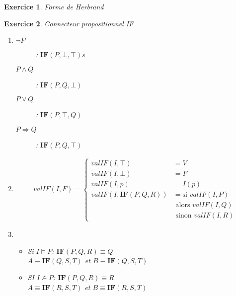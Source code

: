 \documentclass{article}
\theoremstyle{plain}
\newtheorem{exo}{Exercice}%
\begin{document}
\begin{exo} Forme de Herbrand
    
\end{exo}

\begin{exo} Connecteur propositionnel IF
\begin{enumerate}
    \item \begin{description}
        \item[$\neg P$]: $\textbf{IF}(P, \bot, \top)$s
        \item[$P \wedge Q$]: $\textbf{IF}(P, Q, \bot)$
        \item[$P \vee Q$]: $\textbf{IF}(P, \top, Q)$
        \item[$P \Rightarrow Q$]: $\textbf{IF}(P, Q, \top)$
    \end{description}

    \item \begin{align*}
        valIF(I, F) = \begin{cases}
            valIF(I, \top) &= V \\
            valIF(I, \bot) &= F \\
            valIF(I, p) &= I(p) \\
            valIF(I, \textbf{IF}(P, Q, R)) &= \text{si } valIF(I, P) \\
                                        &\text{ alors } valIF(I, Q) \\
                                        &\text{ sinon } valIF(I, R)
        \end{cases}
    \end{align*}

    \item \begin{itemize}
        \item Si $I \models P$: $\textbf{IF}(P, Q, R) \equiv Q$
            \\ $A \equiv \textbf{IF}(Q, S, T)$ et $B \equiv \textbf{IF}(Q, S, T)$
        \item  SI $I \not\models P$: $\textbf{IF}(P, Q, R) \equiv R$
            \\ $A \equiv \textbf{IF}(R, S, T)$ et $B \equiv \textbf{IF}(R, S, T)$
    \end{itemize}


\end{enumerate}
\end{exo}
\end{document}
